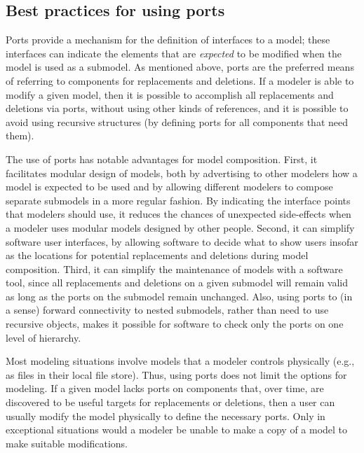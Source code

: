 \subsection{Best practices for using ports}
\label{best-practices-ports}



Ports provide a mechanism for the definition of interfaces to a model;
these interfaces can indicate the elements that are \emph{expected} to
be modified when the model is used as a submodel.  As mentioned above,
ports are the preferred means of referring to components for
replacements and deletions.  If a modeler is able to modify a given
model, then it is possible to accomplish all replacements and deletions
via ports, without using other kinds of references, and it is possible
to avoid using recursive \SBaseRef structures (by defining ports for all
components that need them).

The use of ports has notable advantages for model composition.  First,
it facilitates modular design of models, both by advertising to other
modelers how a model is expected to be used and by allowing different
modelers to compose separate submodels in a more regular fashion.  By
indicating the interface points that modelers should use, it reduces the
chances of unexpected side-effects when a modeler uses modular models
designed by other people.  Second, it can simplify software user
interfaces, by allowing software to decide what to show users insofar as
the locations for potential replacements and deletions during model
composition.  Third, it can simplify the maintenance of models with a
software tool, since all replacements and deletions on a given submodel
will remain valid as long as the ports on the submodel remain unchanged.
Also, using ports to (in a sense) forward connectivity to nested
submodels, rather than need to use recursive \SBaseRef objects, makes it
possible for software to check only the ports on one level of hierarchy.

Most modeling situations involve models that a modeler controls
physically (e.g., as files in their local file store).  Thus, using ports
does not limit the options for modeling.  If a given model lacks ports
on components that, over time, are discovered to be useful targets for
replacements or deletions, then a user can usually modify the model
physically to define the necessary ports.  Only in exceptional
situations would a modeler be unable to make a copy of a model to make
suitable modifications.

